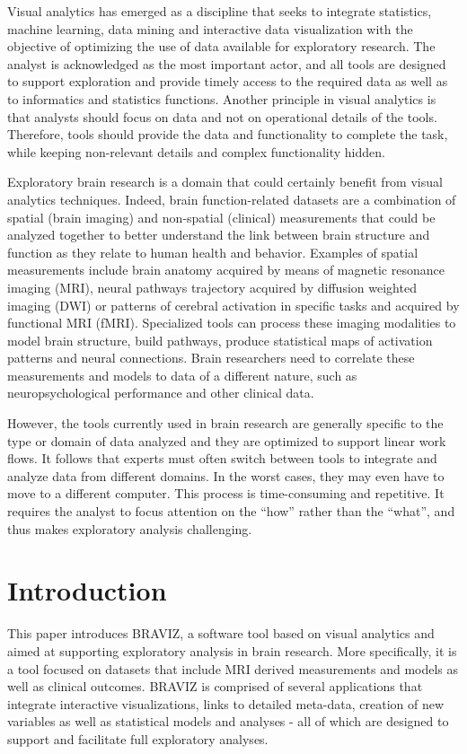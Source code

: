 \documentclass{frontiersHLTH}
\begin{document}
Visual analytics \cite{keim_visual_2008} has emerged as a discipline that seeks to integrate statistics, machine learning, data mining and interactive data visualization with the objective of optimizing the use of data available for exploratory research. The analyst is acknowledged as the most important actor, and all tools are designed to support exploration and provide timely access to the required data as well as to informatics and statistics functions. Another principle in visual analytics is that analysts should focus on data and not on operational details of the tools. Therefore, tools should provide the data and functionality to complete the task, while keeping non-relevant details and complex functionality hidden.

Exploratory brain research is a domain that could certainly benefit from visual analytics techniques. Indeed, brain function-related datasets are a combination of spatial (brain imaging) and non-spatial (clinical) measurements that could be analyzed together to better understand the link between brain structure and function as they relate to human health and behavior. Examples of spatial measurements include brain anatomy acquired by means of magnetic resonance imaging (MRI), neural pathways trajectory acquired by diffusion weighted imaging (DWI) or patterns of cerebral activation in specific tasks and acquired by functional MRI (fMRI). Specialized tools can process these imaging modalities to model brain structure, build pathways, produce statistical maps of activation patterns and neural connections. Brain researchers need to correlate these measurements and models to data of a different nature, such as neuropsychological performance and other clinical data.


However, the tools currently used in brain research are generally specific to the type or domain of data analyzed and they are optimized to support linear work flows. It follows that experts must often switch between tools to integrate and analyze data from different domains. In the worst cases, they may even have to move to a different computer. This process is time-consuming and repetitive. It requires the analyst to focus attention on the ``how'' rather than the ``what'', and thus makes exploratory analysis challenging.
					
\section{Introduction}

This paper introduces BRAVIZ, a software tool based on visual analytics and aimed at supporting exploratory analysis in brain research. More specifically, it is a tool focused on datasets that include MRI derived measurements and models 
as well as clinical outcomes. BRAVIZ is comprised of several applications that integrate interactive visualizations, links to detailed meta-data, creation of new variables as well as statistical models and analyses -  all of which are designed to support and facilitate full exploratory analyses.
\end{document}
